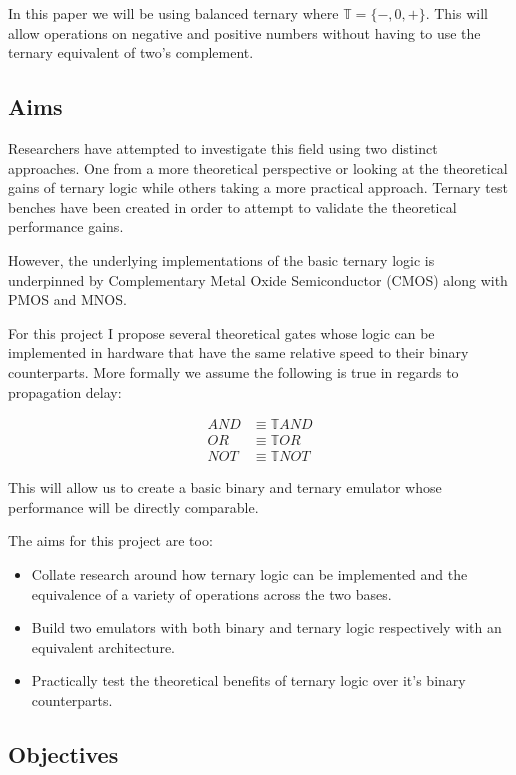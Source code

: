 \documentclass{article}
\begin{document}
In this paper we will be using balanced ternary where $\mathbb{T} = \{-, 0, +\}$. This will allow operations on 
negative and positive numbers without having to use the ternary equivalent of two's complement.

\subsection{Aims}

Researchers have attempted to investigate this field using two distinct approaches. One from a more theoretical perspective
or looking at the theoretical gains of ternary logic while others taking a more practical approach. Ternary test benches
have been created in order to attempt to validate the theoretical performance gains.

However, the underlying implementations of the basic ternary logic is underpinned by Complementary Metal Oxide 
Semiconductor (CMOS) along with PMOS and MNOS.

For this project I propose several theoretical gates whose logic can be implemented in hardware that have the same relative 
speed to their binary counterparts. More formally we assume the following is true in regards to propagation delay:

\begin{equation}
\begin{aligned}
  AND &\equiv \mathbb{T}AND \\
  OR &\equiv \mathbb{T}OR \\
  NOT &\equiv \mathbb{T}NOT
\end{aligned}
\end{equation}

This will allow us to create a basic binary and ternary emulator whose performance will be directly comparable.

The aims for this project are too:
\begin{itemize}
  \item Collate research around how ternary logic can be implemented and the equivalence of a variety of operations across the two bases.
  \item Build two emulators with both binary and ternary logic respectively with an equivalent architecture.
  \item Practically test the theoretical benefits of ternary logic over it's binary counterparts.
\end{itemize}

\subsection{Objectives}
\end{document}
